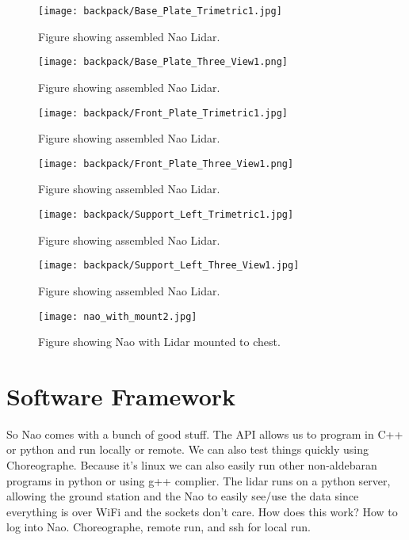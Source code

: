 \begin{figure}
  \centering
  \texttt{[image: backpack/Base\_Plate\_Trimetric1.jpg]}
  \caption{Figure showing assembled Nao Lidar.}
  \label{fig:nao_lidar_mount_baseplate_trimetric1}
\end{figure}

\begin{figure}
  \centering
  \texttt{[image: backpack/Base\_Plate\_Three\_View1.png]}
  \caption{Figure showing assembled Nao Lidar.}
  \label{fig:nao_lidar_mount_baseplate_three_view1}
\end{figure}

\begin{figure}
  \centering
  \texttt{[image: backpack/Front\_Plate\_Trimetric1.jpg]}
  \caption{Figure showing assembled Nao Lidar.}
  \label{fig:nao_lidar_mount_frontplate_trimetric1}
\end{figure}

\begin{figure}
  \centering
  \texttt{[image: backpack/Front\_Plate\_Three\_View1.png]}
  \caption{Figure showing assembled Nao Lidar.}
  \label{fig:nao_lidar_mount_frontplate_three_view1}
\end{figure}

\begin{figure}
  \centering
  \texttt{[image: backpack/Support\_Left\_Trimetric1.jpg]}
  \caption{Figure showing assembled Nao Lidar.}
  \label{fig:nao_lidar_mount_supportleft_trimetric1}
\end{figure}

\begin{figure}
  \centering
  \texttt{[image: backpack/Support\_Left\_Three\_View1.jpg]}
  \caption{Figure showing assembled Nao Lidar.}
  \label{fig:nao_lidar_mount_supportleft_three_view1}
\end{figure}

\begin{figure}
  \centering
  \texttt{[image: nao\_with\_mount2.jpg]}
  \caption{Figure showing Nao with Lidar mounted to chest.}
  \label{fig:nao_lidar_mount1}
\end{figure}

\section{Software Framework}
So Nao comes with a bunch of good stuff. The API allows us to program in C++ or python and run locally or
remote. We can also test things quickly using Choreographe. Because it's linux we can also easily
run other non-aldebaran programs in python or using g++ complier.
The lidar runs on a python server, allowing the ground station and the Nao to easily see/use the data since
everything is over WiFi and the sockets don't care. How does this work?
How to log into Nao. Choreographe, remote run, and ssh for local run.

